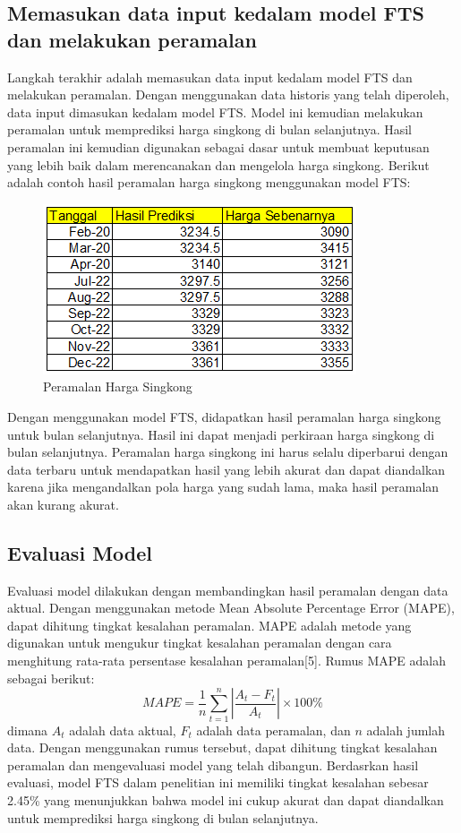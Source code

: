 \documentclass[conference]{IEEEtran}
\begin{document}
\subsection{Memasukan data input kedalam model FTS dan melakukan peramalan}
Langkah terakhir adalah memasukan data input kedalam model FTS dan melakukan peramalan. Dengan menggunakan data historis yang telah diperoleh, data input dimasukan kedalam model FTS. Model ini kemudian melakukan peramalan untuk memprediksi harga singkong di bulan selanjutnya. Hasil peramalan ini kemudian digunakan sebagai dasar untuk membuat keputusan yang lebih baik dalam merencanakan dan mengelola harga singkong. Berikut adalah contoh hasil peramalan harga singkong menggunakan model FTS:
\begin{figure}[H]
    \centering
    \includegraphics[scale=0.5]{images/Peramalan.png} 
    \caption{Peramalan Harga Singkong}
\end{figure}
Dengan menggunakan model FTS, didapatkan hasil peramalan harga singkong untuk bulan selanjutnya. Hasil ini dapat menjadi perkiraan harga singkong di bulan selanjutnya. Peramalan harga singkong ini harus selalu diperbarui dengan data terbaru untuk mendapatkan hasil yang lebih akurat dan dapat diandalkan karena jika mengandalkan pola harga yang sudah lama, maka hasil peramalan akan kurang akurat.

\subsection{Evaluasi Model}
Evaluasi model dilakukan dengan membandingkan hasil peramalan dengan data aktual. Dengan menggunakan metode Mean Absolute Percentage Error (MAPE), dapat dihitung tingkat kesalahan peramalan. MAPE adalah metode yang digunakan untuk mengukur tingkat kesalahan peramalan dengan cara menghitung rata-rata persentase kesalahan peramalan[5]. Rumus MAPE adalah sebagai berikut:
\begin{equation}
    MAPE = \frac{1}{n} \sum_{t=1}^{n} \left| \frac{A_t - F_t}{A_t} \right| \times 100\%
\end{equation}
dimana $A_t$ adalah data aktual, $F_t$ adalah data peramalan, dan $n$ adalah jumlah data. Dengan menggunakan rumus tersebut, dapat dihitung tingkat kesalahan peramalan dan mengevaluasi model yang telah dibangun. Berdasrkan hasil evaluasi, model FTS dalam penelitian ini memiliki tingkat kesalahan sebesar 2.45\% yang menunjukkan bahwa model ini cukup akurat dan dapat diandalkan untuk memprediksi harga singkong di bulan selanjutnya.
\end{document}
